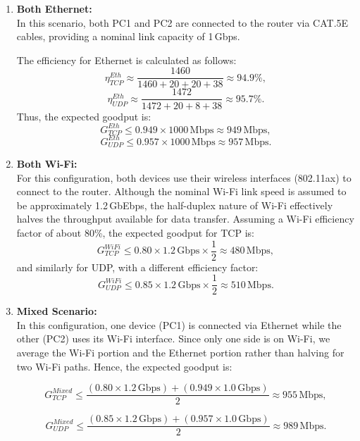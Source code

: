         \begin{enumerate}

            \item \textbf{Both Ethernet:} \\
            In this scenario, both PC1 and PC2 are connected to the router via CAT.5E cables, providing a nominal link capacity of 1\,Gbps. 

            \noindent The efficiency for Ethernet is calculated as follows:
            \[
            \eta_{TCP}^{Eth} \approx \frac{1460}{1460 + 20 + 20 + 38} \approx 94.9\%,
            \]
            \[
            \eta_{UDP}^{Eth} \approx \frac{1472}{1472 + 20 + 8 + 38} \approx 95.7\%.
            \]
            Thus, the expected goodput is:
            \[
            G_{TCP}^{Eth} \leq 0.949 \times 1000\,\text{Mbps} \approx 949\,\text{Mbps},
            \]
            \[
            G_{UDP}^{Eth} \leq 0.957 \times 1000\,\text{Mbps} \approx 957\,\text{Mbps}.
            \]

            \vspace{0.2cm} %

            \item \textbf{Both Wi-Fi:} \\
            For this configuration, both devices use their wireless interfaces (802.11ax) to connect to the router. 
            Although the nominal Wi-Fi link speed is assumed to be approximately 1.2\,GbEbps, the half-duplex nature of Wi-Fi effectively halves the throughput available for data transfer. 
            Assuming a Wi-Fi efficiency factor of about 80\%, the expected goodput for TCP is:
            \[
            G_{TCP}^{WiFi} \leq 0.80 \times 1.2\,\text{Gbps} \times \frac{1}{2} \approx 480\,\text{Mbps},
            \]
            and similarly for UDP, with a different efficiency factor:
            \[
            G_{UDP}^{WiFi} \leq 0.85 \times 1.2\,\text{Gbps} \times \frac{1}{2} \approx 510\,\text{Mbps}.
            \]

            \vspace{0.1cm} %

            \item \textbf{Mixed Scenario:} \\
            In this configuration, one device (PC1) is connected via Ethernet while the other (PC2) uses its Wi-Fi interface. 
            Since only one side is on Wi-Fi, we average the Wi-Fi portion and the Ethernet portion rather than halving for two Wi-Fi paths. 
            Hence, the expected goodput is:

            \[
            G_{TCP}^{Mixed} \leq \frac{(0.80 \times 1.2\,\text{Gbps}) + (0.949 \times 1.0\,\text{Gbps})}{2} \approx 955\,\text{Mbps},
            \]

            \[
            G_{UDP}^{Mixed} \leq \frac{(0.85 \times 1.2\,\text{Gbps}) + (0.957 \times 1.0\,\text{Gbps})}{2} \approx 989\,\text{Mbps}.
            \]

        \end{enumerate}

